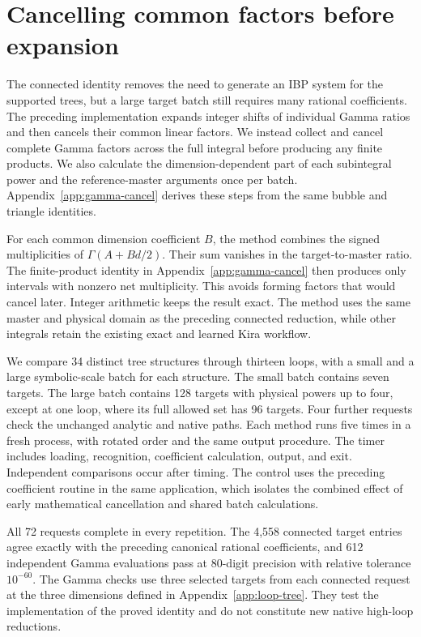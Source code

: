 \section{Cancelling common factors before expansion}
\label{sec:gamma-cancel}
The connected identity removes the need to generate an IBP system for the supported trees, but a large target batch still requires many rational coefficients. The preceding implementation expands integer shifts of individual Gamma ratios and then cancels their common linear factors. We instead collect and cancel complete Gamma factors across the full integral before producing any finite products. We also calculate the dimension-dependent part of each subintegral power and the reference-master arguments once per batch. Appendix~\ref{app:gamma-cancel} derives these steps from the same bubble and triangle identities.

For each common dimension coefficient $B$, the method combines the signed multiplicities of $\Gamma(A+Bd/2)$. Their sum vanishes in the target-to-master ratio. The finite-product identity in Appendix~\ref{app:gamma-cancel} then produces only intervals with nonzero net multiplicity. This avoids forming factors that would cancel later. Integer arithmetic keeps the result exact. The method uses the same master and physical domain as the preceding connected reduction, while other integrals retain the existing exact and learned Kira workflow.

We compare 34 distinct tree structures through thirteen loops, with a small and a large symbolic-scale batch for each structure. The small batch contains seven targets. The large batch contains 128 targets with physical powers up to four, except at one loop, where its full allowed set has 96 targets. Four further requests check the unchanged analytic and native paths. Each method runs five times in a fresh process, with rotated order and the same output procedure. The timer includes loading, recognition, coefficient calculation, output, and exit. Independent comparisons occur after timing. The control uses the preceding coefficient routine in the same application, which isolates the combined effect of early mathematical cancellation and shared batch calculations.

All 72 requests complete in every repetition. The 4,558 connected target entries agree exactly with the preceding canonical rational coefficients, and 612 independent Gamma evaluations pass at 80-digit precision with relative tolerance $10^{-60}$. The Gamma checks use three selected targets from each connected request at the three dimensions defined in Appendix~\ref{app:loop-tree}. They test the implementation of the proved identity and do not constitute new native high-loop reductions.

